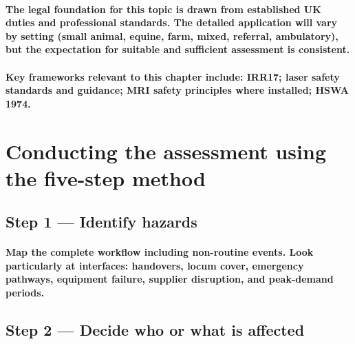 \paragraph{The legal foundation for this topic is drawn from established UK duties and professional standards. The detailed application will vary by setting (small animal, equine, farm, mixed, referral, ambulatory), but the expectation for suitable and sufficient assessment is consistent.}

\paragraph{Key frameworks relevant to this chapter include: IRR17; laser safety standards and guidance; MRI safety principles where installed; HSWA 1974.}

\begin{itemize}
\end{itemize}

\section{Conducting the assessment using the five-step method}

\subsection{Step 1 — Identify hazards}
\paragraph{Map the complete workflow including non-routine events. Look particularly at interfaces: handovers, locum cover, emergency pathways, equipment failure, supplier disruption, and peak-demand periods.}

\subsection{Step 2 — Decide who or what is affected}
